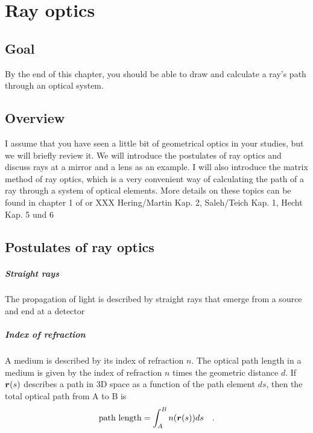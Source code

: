 \renewcommand{\lastmod}{September 18, 2023}
\renewcommand{\chapterauthors}{Markus Lippitz}

\chapter{Ray optics}


\section{Goal}

By the end of this chapter, you should be able to draw and calculate a ray's path through an optical system.



\section{Overview}

I assume that you have seen a little bit of geometrical optics in your studies, but we will briefly review it. We will introduce the postulates of ray optics and discuss rays at a mirror and a lens as an example. I will also introduce the matrix method of ray optics, which is a very convenient way of calculating the path of a ray through a system of optical elements. More details on these topics can be found in chapter 1 of \cite{SalehTeich1991} or XXX Hering/Martin Kap. 2, Saleh/Teich Kap. 1, Hecht Kap. 5 und 6


\section{Postulates of ray optics}

\paragraph*{Straight rays}  The propagation of light is described by straight rays that emerge from a source and end at a detector

\paragraph*{Index of refraction} A medium is described by its index of refraction $n$. The optical path length in a medium is given by the index of refraction $n$ times the geometric distance $d$. If $\boldsymbol{r}(s)$ describes a path in 3D space as a function of the path element $ds$, then the total optical path from A to B is
\begin{equation}
    \text{path length} = \int_A^B n(\boldsymbol{r}(s)) ds \quad .
\end{equation}

